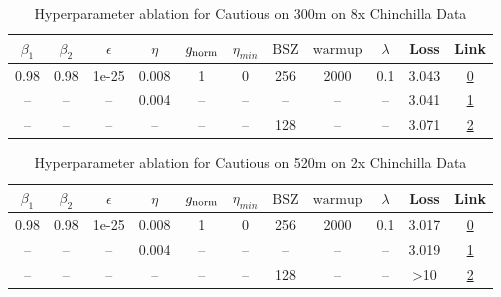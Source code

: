\begin{table}[H]
\centering
\caption{Hyperparameter ablation for Cautious on 300m on 8x Chinchilla Data}
\label{tab:ablation_cautious_300m_on_8x_chinchilla_data}
\begin{tabular}{ccccccccccc}
\toprule
$\beta_1$ & $\beta_2$ & $\epsilon$ & $\eta$ & $g_{\mathrm{norm}}$ & $\eta_{min}$ & $\mathrm{BSZ}$ & $\mathrm{warmup}$ & $\lambda$ & Loss & Link \\
\midrule
0.98 & 0.98 & 1e-25 & 0.008 & 1 & 0 & 256 & 2000 & 0.1 & 3.043 & \href{https://wandb.ai/marin-community/optimizer-scaling/runs/sweep-300m-48B-cautious1c558clr0.008-wd0.1-minlr0-warmup2000-b10-cae294}{0} \\
\midrule
-- & -- & -- & 0.004 & -- & -- & -- & -- & -- & 3.041 & \href{https://wandb.ai/marin-community/optimizer-scaling/runs/sweep-300m-48B-cautious3f9d23lr0.004-wd0.1-minlr0-warmup2000-b10-a68907}{1} \\
-- & -- & -- & -- & -- & -- & 128 & -- & -- & 3.071 & \href{https://wandb.ai/marin-community/optimizer-scaling/runs/sweep-300m-48B-cautious41cea2lr0.008-wd0.1-minlr0-warmup2000-b10-d0662d}{2} \\
\bottomrule
\end{tabular}
\end{table}

\begin{table}[H]
\centering
\caption{Hyperparameter ablation for Cautious on 520m on 2x Chinchilla Data}
\label{tab:ablation_cautious_520m_on_2x_chinchilla_data}
\begin{tabular}{ccccccccccc}
\toprule
$\beta_1$ & $\beta_2$ & $\epsilon$ & $\eta$ & $g_{\mathrm{norm}}$ & $\eta_{min}$ & $\mathrm{BSZ}$ & $\mathrm{warmup}$ & $\lambda$ & Loss & Link \\
\midrule
0.98 & 0.98 & 1e-25 & 0.008 & 1 & 0 & 256 & 2000 & 0.1 & 3.017 & \href{https://wandb.ai/marin-community/optimizer-scaling/runs/sweep-520m-21B-cautiousc38916lr0.008-wd0.1-minlr0-warmup2000-b10-e8000b}{0} \\
\midrule
-- & -- & -- & 0.004 & -- & -- & -- & -- & -- & 3.019 & \href{https://wandb.ai/marin-community/optimizer-scaling/runs/sweep-520m-21B-cautious1579b5lr0.004-wd0.1-minlr0-warmup2000-b10-ef172f}{1} \\
-- & -- & -- & -- & -- & -- & 128 & -- & -- & >10 & \href{https://wandb.ai/marin-community/optimizer-scaling/runs/sweep-520m-21B-cautiousgd91085lr0.008-wd0.1-minlr0-warmup2000-b1-65a0d4}{2} \\
\bottomrule
\end{tabular}
\end{table}

